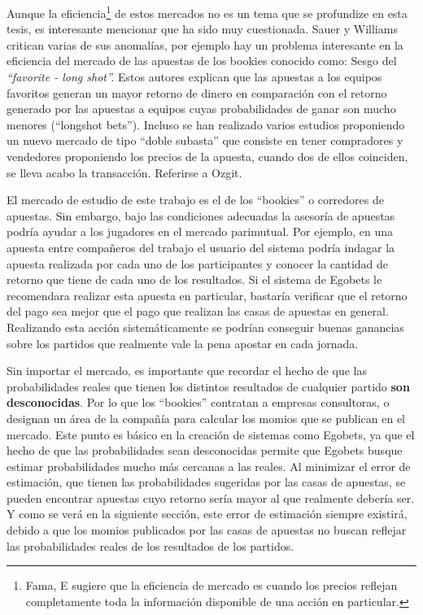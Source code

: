 Aunque la eficiencia\footnote{Fama, E \cite{fama1998market} sugiere que la eficiencia de mercado es cuando los precios reflejan completamente toda la información disponible de una acción en particular.} de estos mercados no es un tema que se profundize en esta tesis, es interesante mencionar que ha sido  muy cuestionada. Sauer \cite{sauer1998economics} y Williams \cite{williams1999information} critican varias de sus anomalías, por ejemplo hay un problema interesante en la eficiencia del mercado de las apuestas de los bookies conocido como: Sesgo del \emph{``favorite - long shot''.} Estos autores explican que las apuestas a los equipos favoritos generan un mayor retorno de dinero en comparación con el retorno generado por las apuestas a equipos cuyas probabilidades de ganar son mucho menores (``longshot bets''). Incluso se han realizado varios estudios proponiendo un nuevo mercado de tipo ``doble subasta'' que consiste en tener compradores y vendedores proponiendo los precios de la apuesta, cuando dos de ellos coinciden, se lleva acabo la transacción. Referirse a Ozgit\cite{ozgit2005posted}.

El mercado de estudio de este trabajo es el de los ``bookies'' o corredores de apuestas. Sin embargo, bajo las condiciones adecuadas la asesoría de apuestas podría ayudar a los jugadores en el mercado parimutual. Por ejemplo, en una apuesta entre compañeros del trabajo el usuario del sistema podría indagar la apuesta realizada por cada uno de los participantes y conocer la cantidad de retorno que tiene de cada uno de los resultados. Si el sistema de Egobets le recomendara realizar esta apuesta en particular, bastaría verificar que el retorno del pago sea mejor que el pago que realizan las casas de apuestas en general. Realizando esta acción sistemáticamente se podrían conseguir buenas ganancias sobre los partidos que realmente vale la pena apostar en cada jornada.

Sin importar el mercado, es importante que recordar el hecho de que las probabilidades reales que tienen los distintos resultados de cualquier partido \textbf{son desconocidas}. Por lo que los ``bookies'' contratan a empresas consultoras, o designan un área de la compañía para calcular los momios que se publican en el mercado. Este punto es básico en la creación de sistemas como Egobets, ya que el hecho de que las probabilidades sean desconocidas permite que Egobets busque estimar probabilidades mucho más cercanas a las reales. Al minimizar el error de estimación, que tienen las probabilidades sugeridas por las casas de apuestas, se pueden encontrar apuestas cuyo retorno sería mayor al que realmente debería ser. Y como se verá en la siguiente sección, este error de estimación siempre existirá, debido a que los momios publicados por las casas de apuestas no buscan reflejar las probabilidades reales de los resultados de los partidos.

